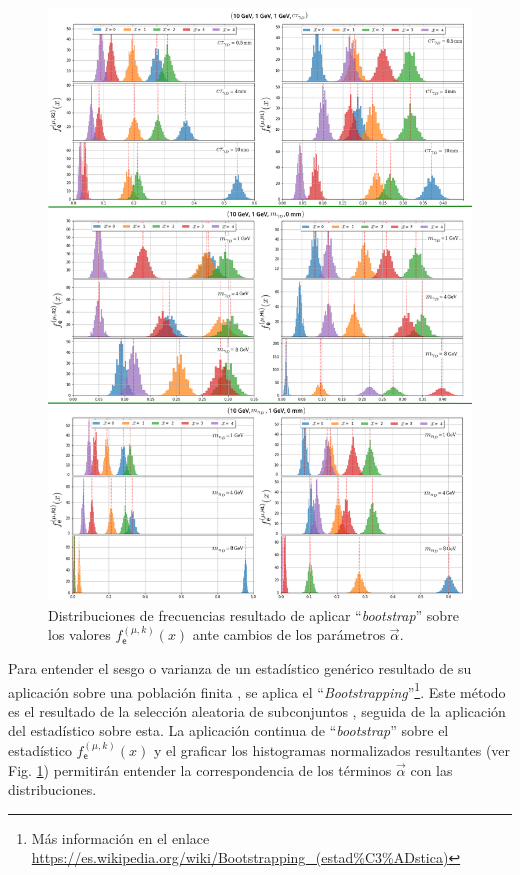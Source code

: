 \begin{figure}[!ht]
\centering
\includegraphics[width=.9\textwidth]{Cap4/imagenes/Distribucion_Entries.png}
\caption{Distribuciones de frecuencias resultado de aplicar ``\textit{bootstrap}'' sobre los valores $f^{(\mu, k)}_\textsf{e} (x)$ ante cambios de los parámetros $\vec{\alpha}$.}
\label{entradas}
\end{figure}

Para entender el sesgo o varianza de un estadístico genérico resultado de su aplicación sobre una población finita%
, se aplica el ``\textit{Bootstrapping}''\footnote{Más información en el enlace \href{https://es.wikipedia.org/wiki/Bootstrapping\_(estad\%C3\%ADstica)}{https://\-es.\-wi\-ki\-pe\-dia.\-org/\-wi\-ki/\-Boots\-tra\-pping\_(es\-tad\-\%C3\-\%AD\-sti\-ca)}}. Este método es el resultado de la selección aleatoria de subconjuntos%
, seguida de la aplicación del estadístico sobre esta. La aplicación continua de ``\textit{bootstrap}'' sobre el estadístico $f^{(\mu, k)}_\textsf{e} (x)$ y el graficar los histogramas normalizados resultantes (ver Fig. \ref{entradas}) permitirán entender la correspondencia de los términos $\vec{\alpha}$ con las distribuciones.


